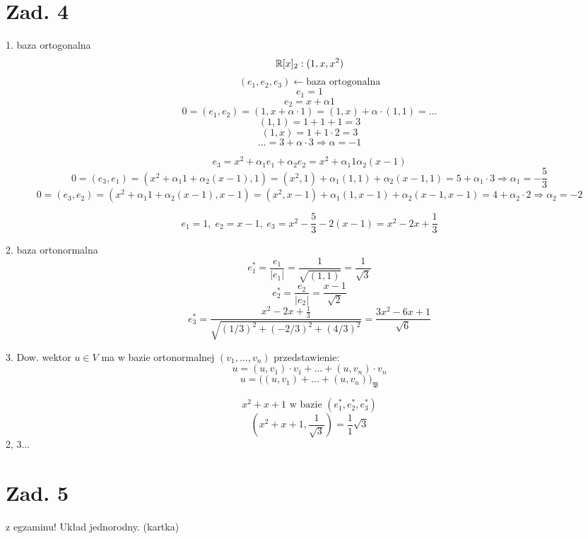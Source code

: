 \documentclass[a4paper,fleqn]{article}
\begin{document}
	\section*{Zad. 4}
	1. baza ortogonalna
	\[ \mathbb{R}[x]_2 : (1,x,x^2) \]
	\[ (e_1, e_2, e_3) \leftarrow \text{baza ortogonalna} \]
	\[ e_1 = 1 \]
	\[ e_2 = x+\alpha 1 \]
	\[ 0 = (e_1, e_2) = (1,x+\alpha \cdot1) = (1,x) + \alpha\cdot(1,1) = \ldots\]
	\[(1,1) = 1+1+1 = 3 \]
	\[ (1,x) = 1+1\cdot2 = 3 \]
	\[ \ldots = 3 +\alpha\cdot3 \Rightarrow \alpha = -1 \]

	\[ e_3 = x^2 + \alpha_1 e_1 + \alpha_2 e_2 = x^2 + \alpha_1 1 \alpha_2 (x-1) \]
	\[ 0 = (e_3,e_1) = (x^2 + \alpha_1 1 + \alpha_2 (x-1), 1) = (x^2,1)+
		\alpha_1(1,1) + \alpha_2(x-1,1) = 5+\alpha_1\cdot 3 \Rightarrow \alpha_1=-\frac5 3 \]
	\[ 0 = (e_3, e_2) = (x^2 + \alpha_1 1 + \alpha_2 (x-1), x-1) = (x^2,x-1)+
		\alpha_1(1,x-1) + \alpha_2(x-1,x-1) = 4+\alpha_2\cdot 2 \Rightarrow \alpha_2=-2 \]

	\[ e_1 = 1, \; e_2 = x-1 ,\; e_3=x^2-\frac 5 3 - 2(x-1) = x^2 - 2x + \frac 1 3 \]

	2. baza ortonormalna
	\[ e_1^* = \frac {e_1}{\vert e_1 \vert} = \frac 1 {\sqrt{(1,1)}} = \frac 1 {\sqrt 3 } \]
	\[ e_2^* = \frac {e_2}{\vert e_2 \vert} = \frac{x-1}{\sqrt 2} \]
	\[ e_3^* = \frac{x^2-2x+\frac 1 3}{\sqrt{(1/3)^2+(-2/3)^2 + (4/3)^2}} =
		\frac{3x^2-6x+1}{\sqrt 6} \]

	3. Dow. wektor $u\in V$ ma w bazie ortonormalnej $(v_1,\ldots,v_n)$ przedstawienie:
	\[ u = (u,v_1)\cdot v_1 + \ldots + (u,v_n)\cdot v_n \]
	\[ u = \big((u,v_1) + \ldots + (u,v_n)\big)_\mathfrak{B} \]

	\[ x^2+x+1 \text{ w bazie } (e_1^*,e_2^*,e_3^*) \]
	\[ (x^2+x+1, \frac 1 {\sqrt 3} ) = \frac 11 {\sqrt 3} \]
	2, 3...

	\section*{Zad. 5}
	z egzaminu! Układ jednorodny. (kartka)
\end{document}
